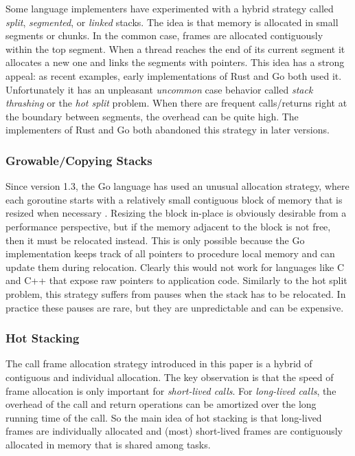 \documentclass[acmsmall,anonymous,review]{acmart}\settopmatter{printfolios=true,printccs=false,printacmref=false}
\begin{document}
Some language implementers have experimented with a hybrid strategy called \emph{split}, \emph{segmented}, or \emph{linked} stacks.
The idea is that memory is allocated in small segments or chunks.
In the common case, frames are allocated contiguously within the top segment.
When a thread reaches the end of its current segment it allocates a new one and links the segments with pointers.
This idea has a strong appeal: as recent examples, early implementations of Rust and Go both used it.
Unfortunately it has an unpleasant \emph{uncommon} case behavior called \emph{stack thrashing} or the \emph{hot split} problem.
When there are frequent calls/returns right at the boundary between segments, the overhead can be quite high.
The implementers of Rust \cite{Anderson2013} and Go \cite{Anastasopoulos2014} both abandoned this strategy in later versions.


\subsubsection{Growable/Copying Stacks}
\label{sec:go_stacks}

Since version 1.3, the Go language has used an unusual allocation strategy, where each goroutine starts with a relatively small contiguous block of memory that is resized when necessary \cite{Cheney2014, Morsing2014}.
Resizing the block in-place is obviously desirable from a performance perspective, but if the memory adjacent to the block is not free, then it must be relocated instead.
This is only possible because the Go implementation keeps track of all pointers to procedure local memory and can update them during relocation.
Clearly this would not work for languages like C and C++ that expose raw pointers to application code.
Similarly to the hot split problem, this strategy suffers from pauses when the stack has to be relocated.
In practice these pauses are rare, but they are unpredictable and can be expensive.

\subsubsection{Hot Stacking}

The call frame allocation strategy introduced in this paper is a hybrid of contiguous and individual allocation.
The key observation is that the speed of frame allocation is only important for \emph{short-lived calls}.
For \emph{long-lived calls}, the overhead of the call and return operations can be amortized over the long running time of the call.
So the main idea of hot stacking is that long-lived frames are individually allocated and (most) short-lived frames are contiguously allocated in memory that is shared among tasks.
\end{document}
